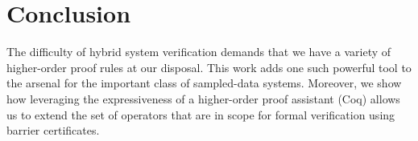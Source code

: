 \section{Conclusion}
\label{sec:conclusion}
The difficulty of hybrid system verification demands that we have a variety
of higher-order proof rules at our disposal. This work adds one such
powerful tool to the arsenal for the important class of sampled-data
systems. Moreover, we show how leveraging the expressiveness of a
higher-order proof assistant (Coq) allows us to extend the set of operators
that are in scope for formal verification using barrier certificates.


